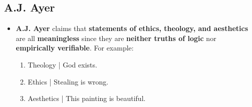 \documentclass{article}
\begin{document}
    \subsection*{A.J. Ayer}
    \begin{itemize}
        \item \textbf{A.J. Ayer} claims that \textbf{statements of ethics, theology, and aesthetics} are all \textbf{meaningless} since they are \textbf{neither truths of logic} nor \textbf{empirically verifiable}. For example:
        \begin{enumerate}
            \item Theology | God exists.
            \item Ethics | Stealing is wrong.
            \item Aesthetics | This painting is beautiful.
        \end{enumerate}
    \end{itemize}
\end{document}
